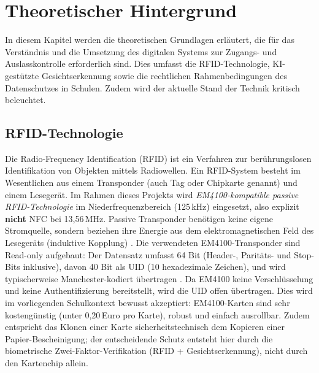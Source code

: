 \section{Theoretischer Hintergrund} \label{sec:theorie}

In diesem Kapitel werden die theoretischen Grundlagen erläutert, die für das Verständnis und die Umsetzung des digitalen Systems zur Zugangs- und Auslasskontrolle erforderlich sind. Dies umfasst die RFID-Technologie, KI-gestützte Gesichtserkennung sowie die rechtlichen Rahmenbedingungen des Datenschutzes in Schulen. Zudem wird der aktuelle Stand der Technik kritisch beleuchtet.

\subsection{RFID-Technologie} \label{subsec:rfid}
Die Radio-Frequency Identification (RFID) ist ein Verfahren zur berührungslosen Identifikation von Objekten mittels Radiowellen. Ein RFID-System besteht im Wesentlichen aus einem Transponder (auch Tag oder Chipkarte genannt) und einem Lesegerät. Im Rahmen dieses Projekts wird \textit{EM4100-kompatible passive RFID-Technologie} im Niederfrequenzbereich (125\,kHz) eingesetzt, also explizit \textbf{nicht} NFC bei 13,56\,MHz. Passive Transponder benötigen keine eigene Stromquelle, sondern beziehen ihre Energie aus dem elektromagnetischen Feld des Lesegeräts (induktive Kopplung) \autocite{finkenzeller2015rfid, em4100_datasheet, iso18000_2}. Die verwendeten EM4100-Transponder sind Read-only aufgebaut: Der Datensatz umfasst 64 Bit (Header-, Paritäts- und Stop-Bits inklusive), davon 40 Bit als UID (10 hexadezimale Zeichen), und wird typischerweise Manchester-kodiert übertragen \autocite{em4100_datasheet}. Da EM4100 keine Verschlüsselung und keine Authentifizierung bereitstellt, wird die UID offen übertragen. Dies wird im vorliegenden Schulkontext bewusst akzeptiert: EM4100-Karten sind sehr kostengünstig (unter 0,20\,Euro pro Karte), robust und einfach ausrollbar. Zudem entspricht das Klonen einer Karte sicherheitstechnisch dem Kopieren einer Papier-Bescheinigung; der entscheidende Schutz entsteht hier durch die biometrische Zwei-Faktor-Verifikation (RFID + Gesichtserkennung), nicht durch den Kartenchip allein.

